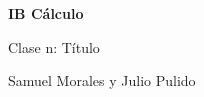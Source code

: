 \documentclass[spanish,12pt]{article}
\begin{document}
	\begin{titlepage}
	\begin{center}
	\hspace{0pt}
	\vfill
	{\Large\textbf{{IB Cálculo}}}
	
	\medskip
	Clase n: Título
	
	\medskip
    Samuel Morales y Julio Pulido
	
	\thispagestyle{empty}
	\vfill
	\end{center}
	\end{titlepage}
\newpage
\tableofcontents
\newpage
\section{}
\subsection{}
\end{document}
